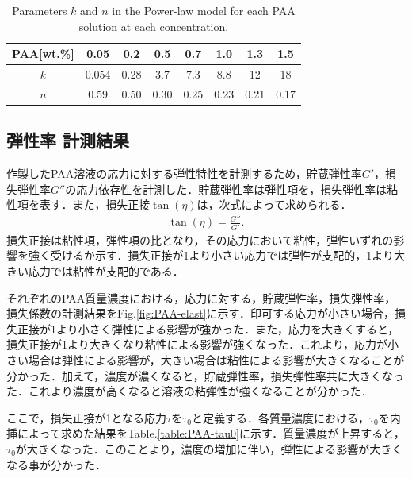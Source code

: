 \begin{table}[h]
	\centering
	\caption{Parameters $k$ and $n$ in the Power-law model for each PAA solution at each concentration.}
	\label{table:power-law}
	\begin{tabular}{c|c|c|c|c|c|c|c} \hline
		PAA[wt.\%] & 0.05  & 0.2  & 0.5  & 0.7  & 1.0  & 1.3  & 1.5  \\ \hline \hline
		$k$        & 0.054 & 0.28 & 3.7  & 7.3  & 8.8  & 12   & 18   \\
		$n$        & 0.59  & 0.50 & 0.30 & 0.25 & 0.23 & 0.21 & 0.17 \\ \hline
	\end{tabular}
\end{table}

\newpage

\subsection{弾性率 計測結果}
\label{sec:elasticity}

作製したPAA溶液の応力に対する弾性特性を計測するため，貯蔵弾性率$G'$，損失弾性率$G''$の応力依存性を計測した．貯蔵弾性率は弾性項を，損失弾性率は粘性項を表す．また，損失正接$\tan\left(\eta\right)$は，次式によって求められる．
\begin{eqnarray}
	\label{eq:loss_factor}
	\tan\left(\eta\right)=\frac{G''}{G'} .
\end{eqnarray}
損失正接は粘性項，弾性項の比となり，その応力において粘性，弾性いずれの影響を強く受けるか示す．損失正接が1より小さい応力では弾性が支配的，1より大きい応力では粘性が支配的である．

それぞれのPAA質量濃度における，応力に対する，貯蔵弾性率，損失弾性率，損失係数の計測結果をFig.\ref{fig:PAA-elast}に示す．印可する応力が小さい場合，損失正接が1より小さく弾性による影響が強かった．また，応力を大きくすると，損失正接が1より大きくなり粘性による影響が強くなった．これより，応力が小さい場合は弾性による影響が，大きい場合は粘性による影響が大きくなることが分かった．加えて，濃度が濃くなると，貯蔵弾性率，損失弾性率共に大きくなった．これより濃度が高くなると溶液の粘弾性が強くなることが分かった．

ここで，損失正接が1となる応力$\tau$を$\tau_0$と定義する．各質量濃度における，$\tau_0$を内挿によって求めた結果をTable.\ref{table:PAA-tau0}に示す．質量濃度が上昇すると，$\tau_0$が大きくなった．このことより，濃度の増加に伴い，弾性による影響が大きくなる事が分かった．

